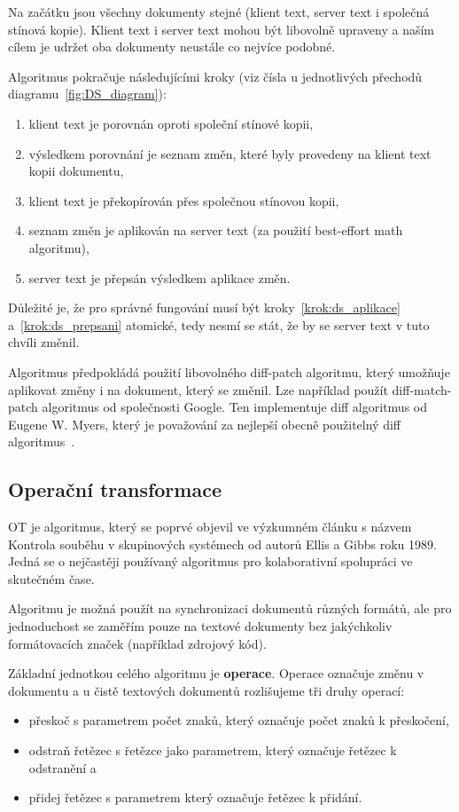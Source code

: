 Na začátku jsou všechny dokumenty stejné (klient text, server text i společná stínová kopie).
Klient text i server text mohou být libovolně upraveny a naším cílem je udržet oba dokumenty neustále co nejvíce podobné.

Algoritmus pokračuje následujícími kroky (viz čísla u jednotlivých přechodů diagramu~\ref{fig:DS_diagram}):
\begin{enumerate}
    \item klient text je porovnán oproti společní stínové kopii,
    \item výsledkem porovnání je seznam změn, které byly provedeny na klient text kopii dokumentu,
    \item klient text je překopírován přes společnou stínovou kopii,
    \item seznam změn je aplikován na server text (za použití best-effort math algoritmu),\label{krok:ds_aplikace}
    \item server text je přepsán výsledkem aplikace změn.\label{krok:ds_prepsani}
\end{enumerate}

Důležité je, že pro správné fungování musí být kroky~\ref{krok:ds_aplikace} a~\ref{krok:ds_prepsani} atomické, tedy nesmí se stát, že by se server text v tuto chvíli změnil.

Algoritmus předpokládá použití libovolného diff-patch algoritmu, který umožňuje aplikovat změny i na dokument, který se změnil.
Lze například použít diff-match-patch algoritmus od společnosti Google.
Ten implementuje diff algoritmus od Eugene W. Myers, který je považování za nejlepší obecně použitelný diff algoritmus~\cite{ds:myers_diff}.~\cite{ds:neil_paper, ds:neil_video}

\subsection{Operační transformace}\label{subsec:operacniTransformace}

\gls{OT} je algoritmus, který se poprvé objevil ve výzkumném článku s názvem Kontrola souběhu v skupinových systémech od autorů Ellis a Gibbs roku 1989.
Jedná se o nejčastěji používaný algoritmus pro kolaborativní spolupráci ve skutečném čase.~\cite{ot:intro}

Algoritmu je možná použít na synchronizaci dokumentů různých formátů, ale pro jednoduchost se zaměřím pouze na textové dokumenty bez jakýchkoliv formátovacích značek (například zdrojový kód).

Základní jednotkou celého algoritmu je \textbf{operace}.
Operace označuje změnu v dokumentu a u čistě textových dokumentů rozlišujeme tři druhy operací:
\begin{itemize}
    \item přeskoč s parametrem počet znaků, který označuje počet znaků k přeskočení,
    \item odstraň řetězec s řetězce jako parametrem, který označuje řetězec k odstranění a
    \item přidej řetězec s parametrem který označuje řetězec k přidání.~\cite{ot:aboutOT}
\end{itemize}

